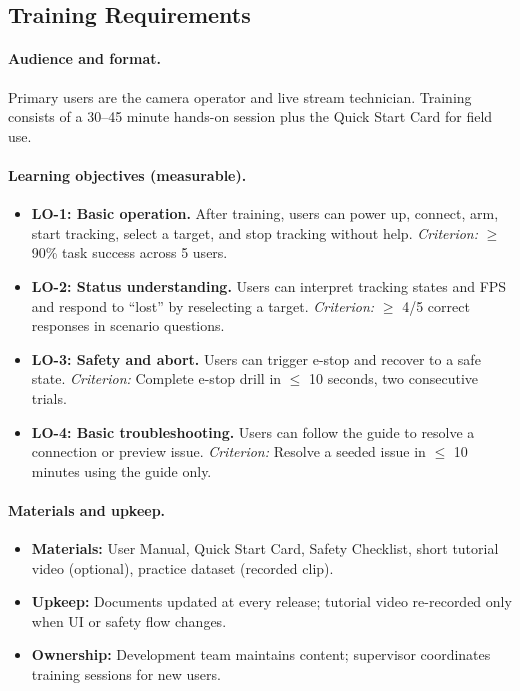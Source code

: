 \documentclass[12pt]{article}
\begin{document}
\subsection{Training Requirements}
\label{subsec:training-reqs}

\paragraph{Audience and format.}
Primary users are the camera operator and live stream technician. Training consists of a 30–45 minute hands-on session plus the Quick Start Card for field use.

\paragraph{Learning objectives (measurable).}
\begin{itemize}
  \item \textbf{LO-1: Basic operation.} After training, users can power up, connect, arm, start tracking, select a target, and stop tracking without help. \emph{Criterion:} $\geq$ 90\% task success across 5 users.
  \item \textbf{LO-2: Status understanding.} Users can interpret tracking states and FPS and respond to “lost” by reselecting a target. \emph{Criterion:} $\geq$ 4/5 correct responses in scenario questions.
  \item \textbf{LO-3: Safety and abort.} Users can trigger e-stop and recover to a safe state. \emph{Criterion:} Complete e-stop drill in $\leq$ 10 seconds, two consecutive trials.
  \item \textbf{LO-4: Basic troubleshooting.} Users can follow the guide to resolve a connection or preview issue. \emph{Criterion:} Resolve a seeded issue in $\leq$ 10 minutes using the guide only.
\end{itemize}

\paragraph{Materials and upkeep.}
\begin{itemize}
  \item \textbf{Materials:} User Manual, Quick Start Card, Safety Checklist, short tutorial video (optional), practice dataset (recorded clip).
  \item \textbf{Upkeep:} Documents updated at every release; tutorial video re-recorded only when UI or safety flow changes.
  \item \textbf{Ownership:} Development team maintains content; supervisor coordinates training sessions for new users.
\end{itemize}
\end{document}
